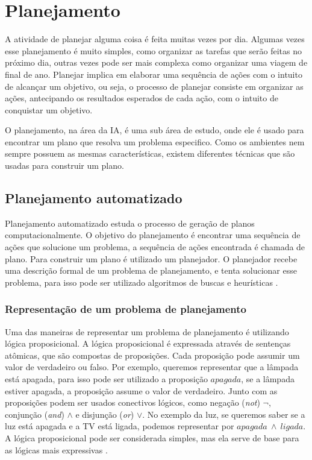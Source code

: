 \chapter{\label{chap:planejamento}Planejamento}

A atividade de planejar alguma coisa é feita muitas vezes por dia. Algumas vezes esse planejamento é muito simples, como organizar as tarefas que serão feitas no próximo dia, outras vezes pode ser mais complexa como organizar uma viagem de final de ano. Planejar implica em elaborar uma sequência de ações com o intuito de alcançar um objetivo, ou seja, o processo de planejar consiste em organizar as ações, antecipando os resultados esperados de cada ação, com o intuito de conquistar um objetivo. 

O planejamento, na área da IA, é uma sub área de estudo, onde ele é usado para encontrar um plano que resolva um problema especifico. Como os ambientes nem sempre possuem as mesmas características, existem diferentes técnicas que são usadas para construir um plano.

\section{Planejamento automatizado}

Planejamento automatizado estuda o processo de geração de planos computacionalmente. O objetivo do planejamento é encontrar uma sequência de ações que solucione um problema, a sequência de ações encontrada é chamada de plano. Para construir um plano é utilizado um planejador. O planejador recebe uma descrição formal de um problema de planejamento, e tenta solucionar esse problema, para isso pode ser utilizado algoritmos de buscas e heurísticas \cite{ghallab2004automated, intelligence2003modern}.

\subsection{Representação de um problema de planejamento}

Uma das maneiras de representar um problema de planejamento é utilizando lógica proposicional.
A lógica proposicional é expressada através de sentenças atômicas, que são compostas de proposições. 
Cada proposição pode assumir um valor de verdadeiro ou falso. 
Por exemplo, queremos representar que a lâmpada está apagada, para isso pode ser utilizado a proposição $apagada$, se a lâmpada estiver apagada, a proposição assume o valor de verdadeiro. Junto com as proposições podem ser usados conectivos lógicos, como negação (\textit{not}) $\neg$, conjunção (\textit{and}) $\wedge$ e disjunção (\textit{or}) $\vee$. 
No exemplo da luz, se queremos saber se a luz está apagada e a TV está ligada, podemos representar por $apagada~ \wedge~ ligada$. 
A lógica proposicional pode ser considerada simples, mas ela serve de base para as lógicas mais expressivas \cite{intelligence2003modern}. 

